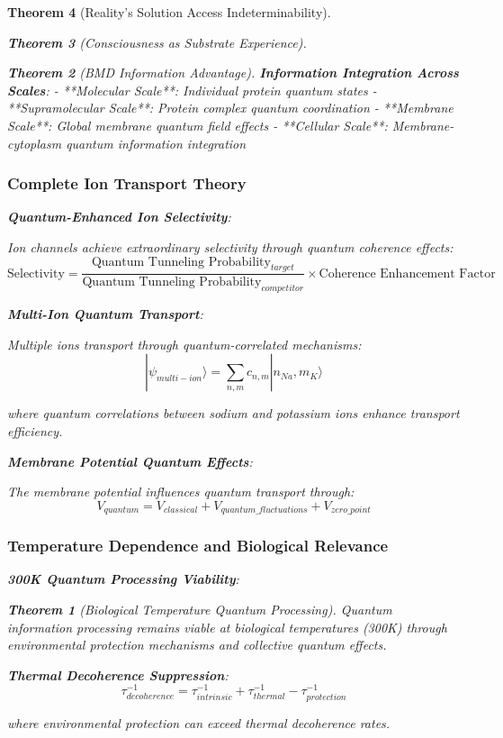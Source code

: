 \documentclass[12pt,a4paper]{article}
\newtheorem{theorem}{Theorem}[section]
\theoremstyle{remark}
\begin{document}
\begin{theorem}[Reality's Solution Access Indeterminability]
\begin{theorem}[Consciousness as Substrate Experience]
\begin{theorem}[BMD Information Advantage]
\textbf{Information Integration Across Scales}:
- **Molecular Scale**: Individual protein quantum states
- **Supramolecular Scale**: Protein complex quantum coordination
- **Membrane Scale**: Global membrane quantum field effects
- **Cellular Scale**: Membrane-cytoplasm quantum information integration

\subsubsection{Complete Ion Transport Theory}

\textbf{Quantum-Enhanced Ion Selectivity}:

Ion channels achieve extraordinary selectivity through quantum coherence effects:
$$\text{Selectivity} = \frac{\text{Quantum Tunneling Probability}_{target}}{\text{Quantum Tunneling Probability}_{competitor}} \times \text{Coherence Enhancement Factor}$$

\textbf{Multi-Ion Quantum Transport}:

Multiple ions transport through quantum-correlated mechanisms:
$$|\psi_{multi-ion}\rangle = \sum_{n,m} c_{n,m} |n_{Na}, m_{K}\rangle$$

where quantum correlations between sodium and potassium ions enhance transport efficiency.

\textbf{Membrane Potential Quantum Effects}:

The membrane potential influences quantum transport through:
$$V_{quantum} = V_{classical} + V_{quantum\_fluctuations} + V_{zero\_point}$$

\subsubsection{Temperature Dependence and Biological Relevance}

\textbf{300K Quantum Processing Viability}:

\begin{theorem}[Biological Temperature Quantum Processing]
Quantum information processing remains viable at biological temperatures (300K) through environmental protection mechanisms and collective quantum effects.
\end{theorem}

\textbf{Thermal Decoherence Suppression}:
$$\tau_{decoherence}^{-1} = \tau_{intrinsic}^{-1} + \tau_{thermal}^{-1} - \tau_{protection}^{-1}$$

where environmental protection can exceed thermal decoherence rates.


\end{theorem}
\end{theorem}
\end{theorem}
\end{document}
